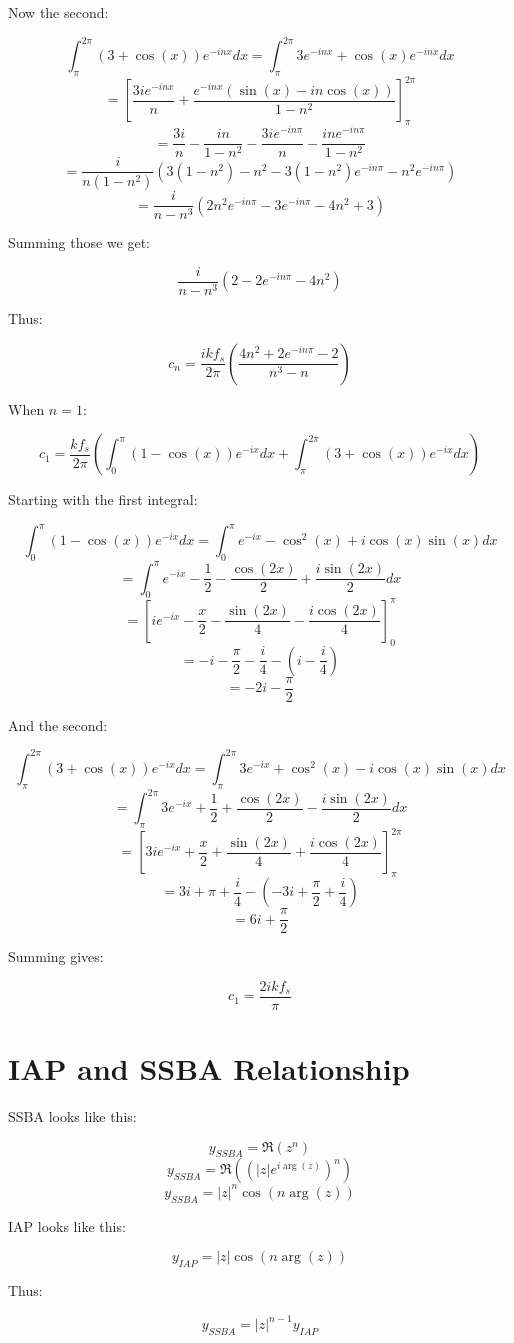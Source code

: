 \documentclass[a4paper]{article}
\begin{document}
	Now the second:

	\[ \int_{\pi}^{2\pi} (3+\cos(x))e^{-inx} dx = \int_{\pi}^{2\pi} 3e^{-inx} + \cos(x)e^{-inx} dx \]
	\[ = \left[ \frac{3ie^{-inx}}{n} + \frac{e^{-inx}(\sin(x) - in\cos(x))}{1 - n^{2}} \right]_{\pi}^{2\pi} \]
	\[ = \frac{3i}{n} - \frac{in}{1 - n^{2}} - \frac{3ie^{-in\pi}}{n} - \frac{ine^{-in\pi}}{1 - n^{2}} \]
	\[ = \frac{i}{n(1-n^{2})} \left( 3(1-n^{2}) - n^{2} - 3(1-n^{2})e^{-in\pi} - n^{2}e^{-in\pi} \right) \]
	\[ = \frac{i}{n - n^{3}} \left( 2n^{2}e^{-in\pi} - 3e^{-in\pi} - 4n^{2} + 3 \right) \]

	Summing those we get:

	\[ \frac{i}{n - n^{3}} \left( 2 - 2e^{-in\pi} - 4n^{2} \right) \]

	Thus:

	\[ c_{n} = \frac{ikf_{s}}{2\pi} \left( \frac{4n^{2} + 2e^{-in\pi} - 2}{n^{3} - n} \right) \]

	When $n = 1$:

	\[ c_{1} = \frac{kf_{s}}{2\pi} \left( \int_{0}^{\pi} (1-\cos(x))e^{-ix} dx
				              + \int_{\pi}^{2\pi} (3 + \cos(x))e^{-ix} dx 
			                      \right) \]

	Starting with the first integral:
	
	\[ \int_{0}^{\pi} (1-\cos(x))e^{-ix} dx = \int_{0}^{\pi} e^{-ix} - \cos^{2}(x) + i\cos(x)\sin(x) dx \]
	\[ = \int_{0}^{\pi} e^{-ix} - \frac{1}{2} - \frac{\cos(2x)}{2} + \frac{i\sin(2x)}{2} dx \]
	\[ = \left[ ie^{-ix} - \frac{x}{2} - \frac{\sin(2x)}{4} - \frac{i\cos(2x)}{4} \right]_{0}^{\pi} \]
	\[ = -i - \frac{\pi}{2} - \frac{i}{4} - \left( i - \frac{i}{4} \right) \]
	\[ = -2i - \frac{\pi}{2} \]

	And the second:
	
	\[ \int_{\pi}^{2\pi} (3+\cos(x))e^{-ix} dx = \int_{\pi}^{2\pi} 3e^{-ix} + \cos^{2}(x) - i\cos(x)\sin(x) dx \]
	\[ = \int_{\pi}^{2\pi} 3e^{-ix} + \frac{1}{2} + \frac{\cos(2x)}{2} - \frac{i\sin(2x)}{2} dx \]
	\[ = \left[ 3ie^{-ix} + \frac{x}{2} + \frac{\sin(2x)}{4} + \frac{i\cos(2x)}{4} \right]_{\pi}^{2\pi} \]
	\[ = 3i + \pi + \frac{i}{4} - \left( -3i + \frac{\pi}{2} + \frac{i}{4} \right) \]
	\[ = 6i + \frac{\pi}{2} \]

	Summing gives:

	\[ c_{1} = \frac{2ikf_{s}}{\pi} \]

\section{IAP and SSBA Relationship}
	SSBA looks like this:

	\[ y_{SSBA} = \Re \left( z^{n} \right) \]
	\[ y_{SSBA} = \Re \left( (|z|e^{i\arg(z)})^{n} \right) \]
	\[ y_{SSBA} = |z|^{n}\cos(n\arg(z)) \]

	IAP looks like this:

	\[ y_{IAP} = |z|\cos(n\arg(z)) \]

	Thus:

	\[ y_{SSBA} = |z|^{n-1}y_{IAP} \]
\end{document}
